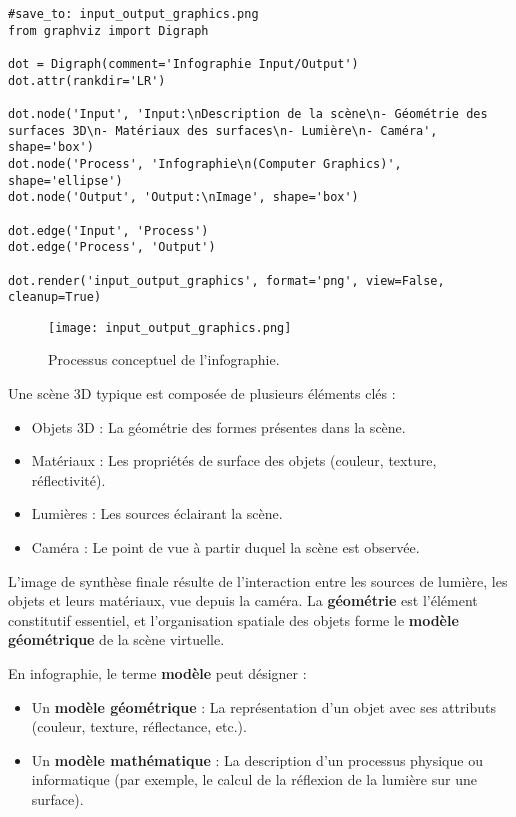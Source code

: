\documentclass{article}
\begin{document}
\begin{verbatim}
#save_to: input_output_graphics.png
from graphviz import Digraph

dot = Digraph(comment='Infographie Input/Output')
dot.attr(rankdir='LR')

dot.node('Input', 'Input:\nDescription de la scène\n- Géométrie des surfaces 3D\n- Matériaux des surfaces\n- Lumière\n- Caméra', shape='box')
dot.node('Process', 'Infographie\n(Computer Graphics)', shape='ellipse')
dot.node('Output', 'Output:\nImage', shape='box')

dot.edge('Input', 'Process')
dot.edge('Process', 'Output')

dot.render('input_output_graphics', format='png', view=False, cleanup=True)
\end{verbatim}

\begin{figure}[H]
\centering
\texttt{[image: input\_output\_graphics.png]}
\caption{Processus conceptuel de l'infographie.}
\label{fig:input_output_graphics}
\end{figure}

Une scène 3D typique est composée de plusieurs éléments clés :
\begin{itemize}
    \item Objets 3D : La géométrie des formes présentes dans la scène.
    \item Matériaux : Les propriétés de surface des objets (couleur, texture, réflectivité).
    \item Lumières : Les sources éclairant la scène.
    \item Caméra : Le point de vue à partir duquel la scène est observée.
\end{itemize}
L'image de synthèse finale résulte de l'interaction entre les sources de lumière, les objets et leurs matériaux, vue depuis la caméra. La \textbf{géométrie} est l'élément constitutif essentiel, et l'organisation spatiale des objets forme le \textbf{modèle géométrique} de la scène virtuelle.

En infographie, le terme \textbf{modèle} peut désigner :
\begin{itemize}
    \item Un \textbf{modèle géométrique} : La représentation d'un objet avec ses attributs (couleur, texture, réflectance, etc.).
    \item Un \textbf{modèle mathématique} : La description d'un processus physique ou informatique (par exemple, le calcul de la réflexion de la lumière sur une surface).
\end{itemize}
\end{document}
